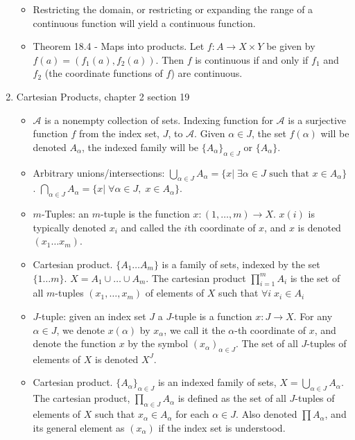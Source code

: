 \documentclass[12pt,letterpaper]{article}
\begin{document}
\begin{enumerate}
\begin{itemize}
    \item \label{thm:ChangingRangeDomainContinuity} Restricting the domain, or restricting or expanding the range of a continuous function will yield a continuous function.
    \item \label{thm:MapsProducts18.4} Theorem 18.4 - Maps into products. Let $f : A\rightarrow X\times Y$ be given by $f(a)=(f_1(a),f_2(a))$. Then $f$ is continuous if and only if $f_1$ and $f_2$ (the coordinate functions of $f$) are continuous.
  \end{itemize}
  \item \label{dfn:cartesianProducts} Cartesian Products, chapter 2 section 19
  \begin{itemize}
    \item $\mathcal{A}$ is a nonempty collection of sets. Indexing function for $\mathcal{A}$ is a surjective function $f$ from the index set, $J$, to $\mathcal{A}$. Given $\alpha \in J$, the set $f(\alpha)$ will be denoted $A_\alpha$, the indexed family will be $\{A_\alpha\}_{\alpha\in J}$ or $\{A_\alpha\}$.
    \item Arbitrary unions/intersections: $\displaystyle\bigcup_{\alpha\in J} A_\alpha = \{x |\; \exists \alpha \in J \text{ such that } x\in A_\alpha \}$. $\displaystyle\bigcap_{\alpha\in J} A_\alpha = \{x |\; \forall \alpha \in J,\; x\in A_\alpha \}$.
    \item $m$-Tuples: an $m$-tuple is the function $x: (1,\dots,m)\rightarrow X$. $x(i)$ is typically denoted $x_i$ and called the $i$th coordinate of $x$, and $x$ is denoted $(x_1\dots x_m)$.
    \item Cartesian product. $\{A_1\dots A_m\}$ is a family of sets, indexed by the set $\{1\dots m\}$. $X = A_1 \cup\dots \cup A_m$. The cartesian product $\displaystyle\prod_{i=1}^{m}A_i$ is the set of all $m$-tuples $(x_1,\dots ,x_m)$ of elements of $X$ such that $\forall i\; x_i \in A_i$
    \item $J$-tuple: given an index set $J$ a $J$-tuple is a function $x: J\rightarrow X$. For any $\alpha\in J$, we denote $x(\alpha)$ by $x_\alpha$, we call it the $\alpha$-th coordinate of $x$, and denote the function $x$ by the symbol $(x_\alpha)_{\alpha\in J}$. The set of all $J$-tuples of elements of $X$ is denoted $X^J$.
    \item Cartesian product. $\{A_\alpha\}_{\alpha\in J}$ is an indexed family of sets, $X=\bigcup_{\alpha\in J}A_\alpha$. The cartesian product, $\prod_{\alpha\in J} A_\alpha$ is defined as the set of all $J$-tuples of elements of $X$ such that $x_\alpha \in A_\alpha$ for each $\alpha\in J$. Also denoted $\prod A_\alpha$, and its general element as $(x_\alpha)$ if the index set is understood.

\end{itemize}
\end{enumerate}
\end{document}
